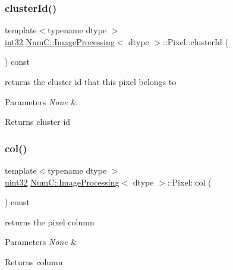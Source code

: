 \subsubsection{\texorpdfstring{cluster\+Id()}{clusterId()}}
{\footnotesize\ttfamily template$<$typename dtype $>$ \\
\mbox{\hyperlink{namespace_num_c_aa5a7e69266097d55816d4cdb19542b53}{int32}} \mbox{\hyperlink{class_num_c_1_1_image_processing}{Num\+C\+::\+Image\+Processing}}$<$ dtype $>$\+::Pixel\+::cluster\+Id (\begin{DoxyParamCaption}{ }\end{DoxyParamCaption}) const\hspace{0.3cm}{\ttfamily [inline]}}

returns the cluster id that this pixel belongs to


\begin{DoxyParams}{Parameters}
{\em None} & \\
\hline
\end{DoxyParams}
\begin{DoxyReturn}{Returns}
cluster id 
\end{DoxyReturn}
\mbox{\label{class_num_c_1_1_image_processing_1_1_pixel_a1819a3d5224c879ed100e20f354aa722}} 
\subsubsection{\texorpdfstring{col()}{col()}}
{\footnotesize\ttfamily template$<$typename dtype $>$ \\
\mbox{\hyperlink{namespace_num_c_ae685802ca6d3035f2b400b081e3953fa}{uint32}} \mbox{\hyperlink{class_num_c_1_1_image_processing}{Num\+C\+::\+Image\+Processing}}$<$ dtype $>$\+::Pixel\+::col (\begin{DoxyParamCaption}{ }\end{DoxyParamCaption}) const\hspace{0.3cm}{\ttfamily [inline]}}

returns the pixel column


\begin{DoxyParams}{Parameters}
{\em None} & \\
\hline
\end{DoxyParams}
\begin{DoxyReturn}{Returns}
column 
\end{DoxyReturn}
\mbox{\label{class_num_c_1_1_image_processing_1_1_pixel_a614d9061c2a04982883d977642ad5852}} 
